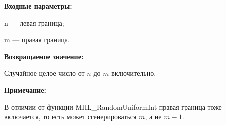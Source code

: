 \textbf{Входные параметры:}

n --- левая граница;

 m --- правая граница.

\textbf{Возвращаемое значение:}

Случайное целое число от $n$ до $m$ включительно.

\textbf{Примечание:}

 В отличии от функции MHL\_RandomUniformInt правая граница тоже включается, то есть может сгенерироваться $m$, а не $m-1$.
